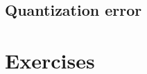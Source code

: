 \documentclass[11pt]{article}
\begin{document}
\subsection{Quantization error}


\section{Exercises}









\end{document}
